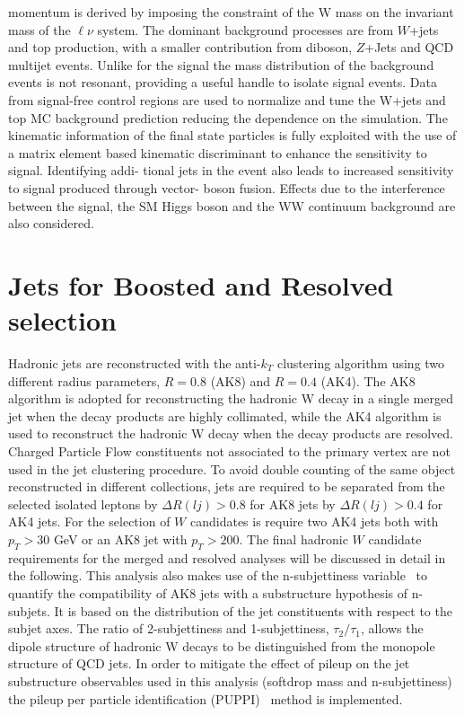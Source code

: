 momentum is derived by imposing the constraint of the W mass on the invariant mass of the $\ell \nu$ system.
The dominant background processes
are from $W$+jets and top production, with a smaller contribution from diboson, $Z$+Jets and
QCD multijet events. Unlike for the signal the mass distribution of the background events is
not resonant, providing a useful handle to isolate signal events. Data from signal-free control
regions are used to normalize and tune the W+jets and top MC background prediction reducing
the dependence on the simulation.
The kinematic information of the final state particles is fully exploited with the use of a matrix
element based kinematic discriminant to enhance the sensitivity to signal. Identifying addi-
tional jets in the event also leads to increased sensitivity to signal produced through vector-
boson fusion. Effects due to the interference between the signal, the SM Higgs boson and
the WW continuum background are also considered.

\section{Jets for Boosted and Resolved selection}
Hadronic jets are reconstructed with the anti-$k_T$ clustering algorithm  using two different
radius parameters, $R = 0.8$ (AK8) and $R = 0.4$ (AK4). The AK8 algorithm is adopted for
reconstructing the hadronic W decay in a single merged jet when the decay products are highly
collimated, while the AK4 algorithm is used to reconstruct the hadronic W decay when the
decay products are resolved.
Charged Particle Flow
constituents not associated to the primary vertex are not used in the jet clustering procedure.
To avoid double counting of the same object
reconstructed in different collections, jets are required to be separated from the selected isolated
leptons by $\Delta R(lj)> 0.8 $ for AK8 jets by  $\Delta R(lj)> 0.4$ for AK4 jets.
For the selection of $W$ candidates is require two AK4 jets both with $p_T>30$ GeV or an AK8 jet with  $p_T>200$.
The final hadronic $W$ candidate requirements for the merged and resolved analyses
will be discussed in detail in the following.
This analysis also makes use of the n-subjettiness variable~\cite{Thaler:2011gf}  to quantify the compatibility
of AK8 jets with a substructure hypothesis of n-subjets. It is based on the distribution of the
jet constituents with respect to the subjet axes. The ratio of 2-subjettiness and 1-subjettiness,
 $\tau_2 /\tau_1$, allows the dipole structure of hadronic W decays to be distinguished from the monopole
structure of QCD jets.
In order to mitigate the effect of pileup on the jet substructure observables used in this analysis
(softdrop mass and n-subjettiness) the pileup per particle identification (PUPPI)~\cite{Bertolini2014} method is
implemented.

